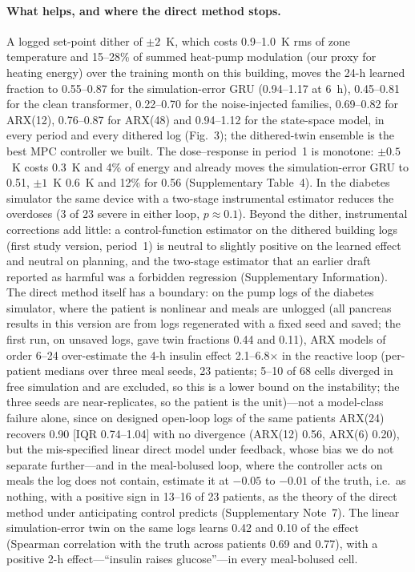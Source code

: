\documentclass[11pt]{article}
\newcommand{\pancreasarx}{Supplementary Note~7}
\begin{document}
\paragraph{What helps, and where the direct method stops.} A logged set-point dither of $\pm2$~K, which costs 0.9--1.0~K rms of zone temperature and 15--28\% of summed heat-pump modulation (our proxy for heating energy) over the training month on this building, moves the 24-h learned fraction to 0.55--0.87 for the simulation-error GRU (0.94--1.17 at 6~h), 0.45--0.81 for the clean transformer, 0.22--0.70 for the noise-injected families, 0.69--0.82 for ARX(12), 0.76--0.87 for ARX(48) and 0.94--1.12 for the state-space model, in every period and every dithered log (Fig.~3); the dithered-twin ensemble is the best MPC controller we built. The dose--response in period~1 is monotone: $\pm0.5$~K costs 0.3~K and 4\% of energy and already moves the simulation-error GRU to 0.51, $\pm1$~K 0.6~K and 12\% for 0.56 (Supplementary Table~4). In the diabetes simulator the same device with a two-stage instrumental estimator \citep{angrist2009} reduces the overdoses (3 of 23 severe in either loop, $p\approx0.1$). Beyond the dither, instrumental corrections add little: a control-function estimator on the dithered building logs (first study version, period~1) is neutral to slightly positive on the learned effect and neutral on planning, and the two-stage estimator that an earlier draft reported as harmful was a forbidden regression (Supplementary Information). The direct method itself has a boundary: on the pump logs of the diabetes simulator, where the patient is nonlinear and meals are unlogged (all pancreas results in this version are from logs regenerated with a fixed seed and saved; the first run, on unsaved logs, gave twin fractions 0.44 and 0.11), ARX models of order 6--24 over-estimate the 4-h insulin effect 2.1--6.8$\times$ in the reactive loop (per-patient medians over three meal seeds, 23 patients; 5--10 of 68 cells diverged in free simulation and are excluded, so this is a lower bound on the instability; the three seeds are near-replicates, so the patient is the unit)---not a model-class failure alone, since on designed open-loop logs of the same patients ARX(24) recovers 0.90 [IQR 0.74--1.04] with no divergence (ARX(12) 0.56, ARX(6) 0.20), but the mis-specified linear direct model under feedback, whose bias we do not separate further---and in the meal-bolused loop, where the controller acts on meals the log does not contain, estimate it at $-0.05$ to $-0.01$ of the truth, i.e.\ as nothing, with a positive sign in 13--16 of 23 patients, as the theory of the direct method under anticipating control predicts (\pancreasarx). The linear simulation-error twin on the same logs learns 0.42 and 0.10 of the effect (Spearman correlation with the truth across patients 0.69 and 0.77), with a positive 2-h effect---``insulin raises glucose''---in every meal-bolused cell.
\end{document}
